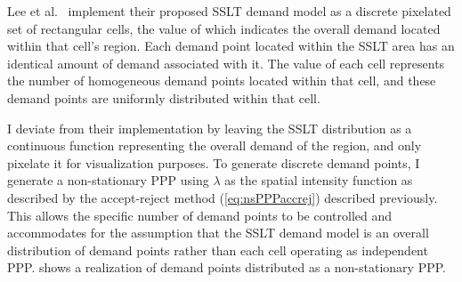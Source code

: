 \documentclass[12pt,dvipsnames]{report}
\begin{document}
Lee et al.~\cite{6554749, 6757900} implement their proposed SSLT demand model as a discrete pixelated set of rectangular cells, the value of which indicates the overall demand located within that cell's region.  Each demand point located within the SSLT area has an identical amount of demand associated with it.  The value of each cell represents the number of homogeneous demand points located within that cell, and these demand points are uniformly distributed within that cell.

I deviate from their implementation by leaving the SSLT distribution as a continuous function representing the overall demand of the region, and only pixelate it for visualization purposes.  To generate discrete demand points, I generate a non-stationary PPP using $\lambda$ as the spatial intensity function as described by the accept-reject method (\cref{eq:nsPPPaccrej}) described previously.  This allows the specific number of demand points to be controlled and accommodates for the assumption that the SSLT demand model is an overall distribution of demand points rather than each cell operating as independent PPP.   shows a realization of demand points distributed as a non-stationary PPP.
\end{document}
